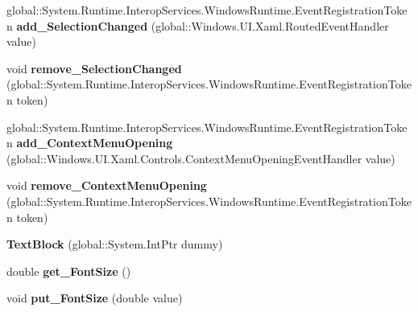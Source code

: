 \begin{DoxyCompactItemize}
global\+::\+System.\+Runtime.\+Interop\+Services.\+Windows\+Runtime.\+Event\+Registration\+Token {\bfseries add\+\_\+\+Selection\+Changed} (global\+::\+Windows.\+U\+I.\+Xaml.\+Routed\+Event\+Handler value)
\item 
\mbox{\label{class_windows_1_1_u_i_1_1_xaml_1_1_controls_1_1_text_block_a0ec7a0aed82f465da9f07b1f0bb2f222}} 
void {\bfseries remove\+\_\+\+Selection\+Changed} (global\+::\+System.\+Runtime.\+Interop\+Services.\+Windows\+Runtime.\+Event\+Registration\+Token token)
\item 
\mbox{\label{class_windows_1_1_u_i_1_1_xaml_1_1_controls_1_1_text_block_abe06af10f87317e305ba6d841b08607c}} 
global\+::\+System.\+Runtime.\+Interop\+Services.\+Windows\+Runtime.\+Event\+Registration\+Token {\bfseries add\+\_\+\+Context\+Menu\+Opening} (global\+::\+Windows.\+U\+I.\+Xaml.\+Controls.\+Context\+Menu\+Opening\+Event\+Handler value)
\item 
\mbox{\label{class_windows_1_1_u_i_1_1_xaml_1_1_controls_1_1_text_block_ac298be0da72f4c9f2a436c5949a660d7}} 
void {\bfseries remove\+\_\+\+Context\+Menu\+Opening} (global\+::\+System.\+Runtime.\+Interop\+Services.\+Windows\+Runtime.\+Event\+Registration\+Token token)
\item 
\mbox{\label{class_windows_1_1_u_i_1_1_xaml_1_1_controls_1_1_text_block_a626ff976bc29fd838fa655f97f2533b0}} 
{\bfseries Text\+Block} (global\+::\+System.\+Int\+Ptr dummy)
\item 
\mbox{\label{class_windows_1_1_u_i_1_1_xaml_1_1_controls_1_1_text_block_ae396cab368662cf3d314b4c8cf21d51b}} 
double {\bfseries get\+\_\+\+Font\+Size} ()
\item 
\mbox{\label{class_windows_1_1_u_i_1_1_xaml_1_1_controls_1_1_text_block_a610333d337bf2e0cf5c901ca88ce3a21}} 
void {\bfseries put\+\_\+\+Font\+Size} (double value)
\item 
\mbox{\label{class_windows_1_1_u_i_1_1_xaml_1_1_controls_1_1_text_block_a7e6fe2e6c2baed541c6ec98293bfde3e}} 

\end{DoxyCompactItemize}
